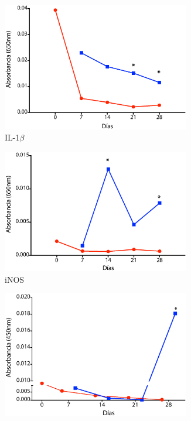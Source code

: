 \documentclass[12pt,letterpaper,oneside]{scrbook}
\begin{document}
\begin{figure}[h]
        \ContinuedFloat
    \begin{subfigure}{0.5\textwidth}
        \includegraphics[width=0.9\textwidth]{eps/ELISA/eil1b}
        \caption{IL-1$\beta$}
        \label{fig:elisa:il1b}
    \end{subfigure}
    \begin{subfigure}{0.5\textwidth}
        \includegraphics[width=0.9\textwidth]{eps/ELISA/einos}
        \caption{iNOS}
        \label{fig:elisa:inos}
    \end{subfigure}
    \begin{subfigure}{0.5\textwidth}
        \includegraphics[width=0.9\textwidth]{eps/ELISA/eil12}

\end{subfigure}
\end{figure}
\end{document}
